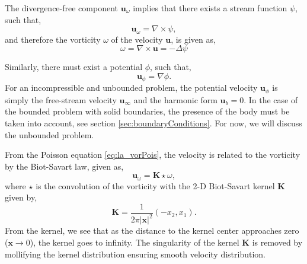 The divergence-free component $\mathbf{u}_{\omega}$ implies that there exists a stream function $\psi$, such that,
	\begin{equation}
	\mathbf{u}_{\omega} = \nabla \times \psi,
	\end{equation} 
and therefore the vorticity $\omega$ of the velocity $\mathbf{u}$, is given as,
	\begin{equation}
	\omega = \nabla \times \mathbf{u} = - \Delta \psi
	\label{eq:la_vorPois}
	\end{equation}

Similarly, there must exist a potential $\phi$, such that,
	\begin{equation}
	\mathbf{u}_{\phi} = \nabla \phi.
	\end{equation}
For an incompressible and unbounded problem, the potential velocity $\mathbf{u}_{\phi}$ is simply the free-stream velocity $\mathbf{u}_{\infty}$ and the harmonic form $\mathbf{u}_b = 0$. In the case of the bounded problem with solid boundaries, the presence of the body must be taken into account, see section \ref{sec:boundaryConditions}. For now, we will discuss the unbounded problem.

From the Poisson equation \ref{eq:la_vorPois}, the velocity is related to the vorticity by the Biot-Savart law, given as,
	\begin{equation}
	\mathbf{u}_{\omega} = \mathbf{K}\star\omega,
	\end{equation}
where $\star$ is the convolution of the vorticity with the 2-D Biot-Savart kernel $\mathbf{K}$ given by,
	\begin{equation}
	\mathbf{K} = \frac{1}{2\pi\left|\mathbf{x}\right|^2}\left(-x_2,x_1\right).
	\label{eq:GreensKernel}
	\end{equation}
From the kernel, we see that as the distance to the kernel center approaches zero ($\mathbf{x} \rightarrow 0$), the kernel goes to infinity. The singularity of the kernel $\mathbf{K}$ is removed by mollifying the kernel distribution ensuring smooth velocity distribution.



